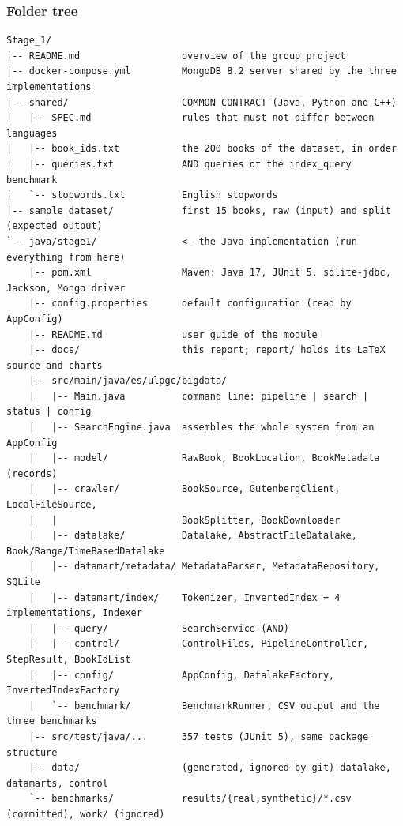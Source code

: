 \documentclass[11pt,a4paper]{article}
\begin{document}
\subsubsection{Folder tree}
\begin{lstlisting}[style=shell]
Stage_1/
|-- README.md                  overview of the group project
|-- docker-compose.yml         MongoDB 8.2 server shared by the three implementations
|-- shared/                    COMMON CONTRACT (Java, Python and C++)
|   |-- SPEC.md                rules that must not differ between languages
|   |-- book_ids.txt           the 200 books of the dataset, in order
|   |-- queries.txt            AND queries of the index_query benchmark
|   `-- stopwords.txt          English stopwords
|-- sample_dataset/            first 15 books, raw (input) and split (expected output)
`-- java/stage1/               <- the Java implementation (run everything from here)
    |-- pom.xml                Maven: Java 17, JUnit 5, sqlite-jdbc, Jackson, Mongo driver
    |-- config.properties      default configuration (read by AppConfig)
    |-- README.md              user guide of the module
    |-- docs/                  this report; report/ holds its LaTeX source and charts
    |-- src/main/java/es/ulpgc/bigdata/
    |   |-- Main.java          command line: pipeline | search | status | config
    |   |-- SearchEngine.java  assembles the whole system from an AppConfig
    |   |-- model/             RawBook, BookLocation, BookMetadata (records)
    |   |-- crawler/           BookSource, GutenbergClient, LocalFileSource,
    |   |                      BookSplitter, BookDownloader
    |   |-- datalake/          Datalake, AbstractFileDatalake, Book/Range/TimeBasedDatalake
    |   |-- datamart/metadata/ MetadataParser, MetadataRepository, SQLite
    |   |-- datamart/index/    Tokenizer, InvertedIndex + 4 implementations, Indexer
    |   |-- query/             SearchService (AND)
    |   |-- control/           ControlFiles, PipelineController, StepResult, BookIdList
    |   |-- config/            AppConfig, DatalakeFactory, InvertedIndexFactory
    |   `-- benchmark/         BenchmarkRunner, CSV output and the three benchmarks
    |-- src/test/java/...      357 tests (JUnit 5), same package structure
    |-- data/                  (generated, ignored by git) datalake, datamarts, control
    `-- benchmarks/            results/{real,synthetic}/*.csv (committed), work/ (ignored)
\end{lstlisting}
\end{document}

